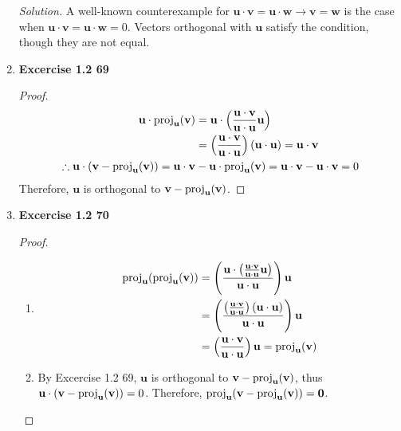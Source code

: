 \begin{enumerate}
		\textit{Solution.}
		A well-known counterexample for $\textbf{u}\cdot\textbf{v}=\textbf{u}\cdot\textbf{w} \rightarrow \textbf{v}=\textbf{w}$ is the case when $\textbf{u}\cdot\textbf{v}=\textbf{u}\cdot\textbf{w}=0$. Vectors orthogonal with $\textbf{u}$ satisfy the condition, though they are not equal.
	\item \textbf{Excercise 1.2 69}
		\begin{proof}
			\begin{align*}
				\textbf{u}\cdot\textnormal{proj}_\textbf{u}(\textbf{v})
				&= \textbf{u}\cdot\left(\frac{\textbf{u}\cdot\textbf{v}}{\textbf{u}\cdot\textbf{u}}\textbf{u}\right) \\
				&= \left(\frac{\textbf{u}\cdot\textbf{v}}{\textbf{u}\cdot\textbf{u}}\right)\left(\textbf{u}\cdot\textbf{u}\right) = \textbf{u}\cdot\textbf{v} \\
				\therefore \textbf{u}\cdot(\textbf{v}-\textnormal{proj}_\textbf{u}(\textbf{v})) = \textbf{u}\cdot\textbf{v} &- \textbf{u}\cdot\textnormal{proj}_\textbf{u}(\textbf{v}) = \textbf{u}\cdot\textbf{v} - \textbf{u}\cdot\textbf{v} = 0
			\end{align*}
			Therefore, $\textbf{u}$ is orthogonal to $\textbf{v}-\textnormal{proj}_\textbf{u}(\textbf{v})$.
		\end{proof}
	\item \textbf{Excercise 1.2 70}
		\begin{proof}
			\begin{enumerate}
			\item
				\begin{align*}
					\textnormal{proj}_\textbf{u}(\textnormal{proj}_\textbf{u}(\textbf{v}))
					&= \left(\frac{\textbf{u}\cdot\left(\frac{\textbf{u}\cdot\textbf{v}}{\textbf{u}\cdot\textbf{u}}\textbf{u}\right)}{\textbf{u}\cdot\textbf{u}}\right)\textbf{u} \\
					&= \left(\frac{\left(\frac{\textbf{u}\cdot\textbf{v}}{\textbf{u}\cdot\textbf{u}}\right)\left(\textbf{u}\cdot\textbf{u}\right)}{\textbf{u}\cdot\textbf{u}}\right)\textbf{u} \\
					&= \left(\frac{\textbf{u}\cdot\textbf{v}}{\textbf{u}\cdot\textbf{u}}\right)\textbf{u} = \textnormal{proj}_\textbf{u}(\textbf{v})
				\end{align*}
			\item By Excercise 1.2 69, $\textbf{u}$ is orthogonal to $\textbf{v}-\textnormal{proj}_\textbf{u}(\textbf{v})$, thus $\textbf{u}\cdot(\textbf{v}-\textnormal{proj}_\textbf{u}(\textbf{v}))=0$. Therefore, $\textnormal{proj}_\textbf{u}(\textbf{v}-\textnormal{proj}_\textbf{u}(\textbf{v})) = \textbf{0}$.

\end{enumerate}
\end{proof}
\end{enumerate}
